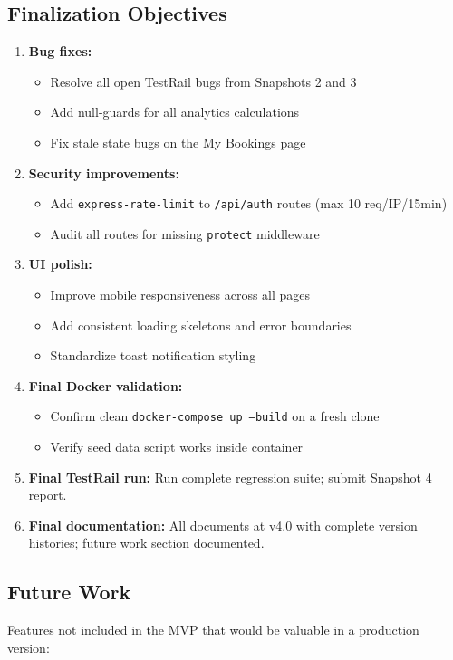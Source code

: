 \documentclass[12pt]{article}
\begin{document}
\subsection{Finalization Objectives}
\begin{enumerate}
    \item \textbf{Bug fixes:}
        \begin{itemize}
            \item Resolve all open TestRail bugs from Snapshots 2 and 3
            \item Add null-guards for all analytics calculations
            \item Fix stale state bugs on the My Bookings page
        \end{itemize}
    \item \textbf{Security improvements:}
        \begin{itemize}
            \item Add \texttt{express-rate-limit} to \texttt{/api/auth} routes (max 10 req/IP/15min)
            \item Audit all routes for missing \texttt{protect} middleware
        \end{itemize}
    \item \textbf{UI polish:}
        \begin{itemize}
            \item Improve mobile responsiveness across all pages
            \item Add consistent loading skeletons and error boundaries
            \item Standardize toast notification styling
        \end{itemize}
    \item \textbf{Final Docker validation:}
        \begin{itemize}
            \item Confirm clean \texttt{docker-compose up --build} on a fresh clone
            \item Verify seed data script works inside container
        \end{itemize}
    \item \textbf{Final TestRail run:} Run complete regression suite; submit Snapshot 4 report.
    \item \textbf{Final documentation:} All documents at v4.0 with complete version histories; future work section documented.
\end{enumerate}

\subsection{Future Work}
Features not included in the MVP that would be valuable in a production version:
\end{document}
